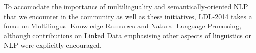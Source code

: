 To accomodate the importance of multilinguality and semantically-oriented NLP that we encounter in the community as well as these initiatives, LDL-2014 takes a focus on Multilingual Knowledge Resources and Natural Language Processing, although contributions on Linked Data emphasising other aspects of linguistics or NLP were explicitly encouraged.